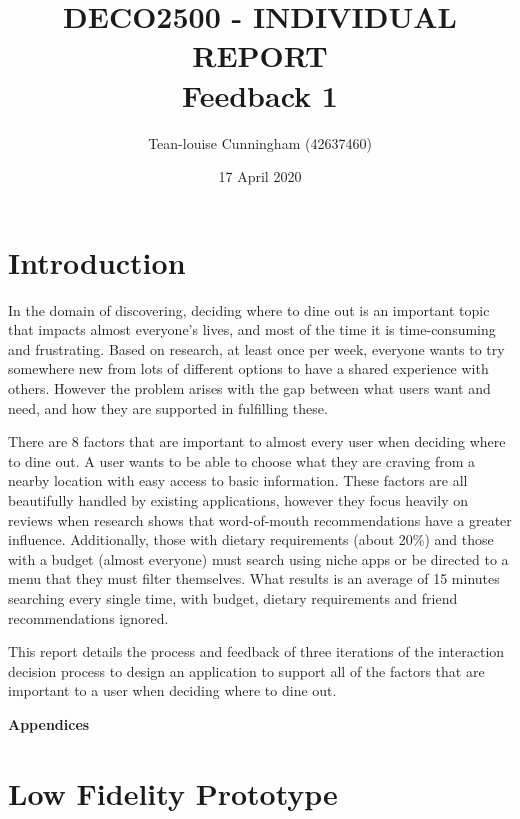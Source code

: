 \documentclass[a4 paper, 12pt]{article}
\title{DECO2500 - INDIVIDUAL REPORT \\ Feedback 1}
\author{Tean-louise Cunningham (42637460)}
\date{17 April 2020}
\begin{document}
\maketitle

\pagebreak
\tableofcontents

\pagebreak
\section{Introduction}
In the domain of discovering, deciding where to dine out is an important topic that impacts almost everyone’s lives, and most of the time it is time-consuming and frustrating. Based on research, at least once per week, everyone wants to try somewhere new from lots of different options to have a shared experience with others. However the problem arises with the gap between what users want and need, and how they are supported in fulfilling these. 

There are 8 factors that are important to almost every user when deciding where to dine out. A user wants to be able to choose what they are craving from a nearby location with easy access to basic information. These factors are all beautifully handled by existing applications, however they focus heavily on reviews when research shows that word-of-mouth recommendations have a greater influence. Additionally, those with dietary requirements (about 20\%) and those with a budget (almost everyone) must search using niche apps or be directed to a menu that they must filter themselves. What results is an average of 15 minutes searching every single time, with budget, dietary requirements and friend recommendations ignored.

This report details the process and feedback of three iterations of the interaction decision process to design an application to support all of the factors that are important to a user when deciding where to dine out. 







\appendix
\addappheadtotoc
\pagebreak

\begin{center}
    \Huge \textbf{Appendices}
\section{Low Fidelity Prototype}
\end{center}
    \pagebreak
\end{document}
